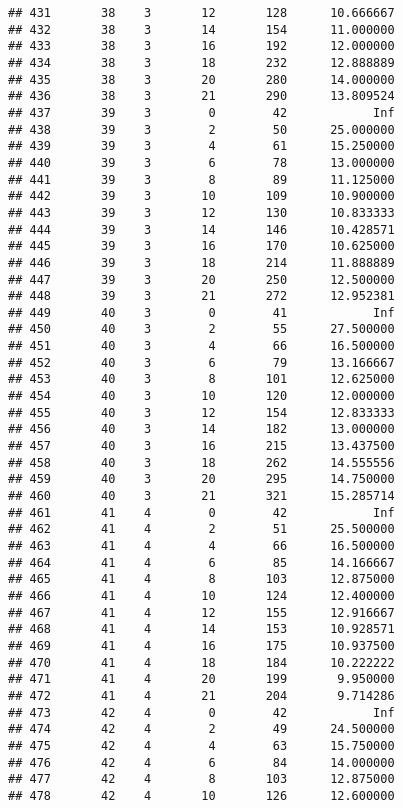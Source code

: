 \documentclass[
]{article}
\begin{document}
\begin{verbatim}
## 431       38    3       12       128      10.666667
## 432       38    3       14       154      11.000000
## 433       38    3       16       192      12.000000
## 434       38    3       18       232      12.888889
## 435       38    3       20       280      14.000000
## 436       38    3       21       290      13.809524
## 437       39    3        0        42            Inf
## 438       39    3        2        50      25.000000
## 439       39    3        4        61      15.250000
## 440       39    3        6        78      13.000000
## 441       39    3        8        89      11.125000
## 442       39    3       10       109      10.900000
## 443       39    3       12       130      10.833333
## 444       39    3       14       146      10.428571
## 445       39    3       16       170      10.625000
## 446       39    3       18       214      11.888889
## 447       39    3       20       250      12.500000
## 448       39    3       21       272      12.952381
## 449       40    3        0        41            Inf
## 450       40    3        2        55      27.500000
## 451       40    3        4        66      16.500000
## 452       40    3        6        79      13.166667
## 453       40    3        8       101      12.625000
## 454       40    3       10       120      12.000000
## 455       40    3       12       154      12.833333
## 456       40    3       14       182      13.000000
## 457       40    3       16       215      13.437500
## 458       40    3       18       262      14.555556
## 459       40    3       20       295      14.750000
## 460       40    3       21       321      15.285714
## 461       41    4        0        42            Inf
## 462       41    4        2        51      25.500000
## 463       41    4        4        66      16.500000
## 464       41    4        6        85      14.166667
## 465       41    4        8       103      12.875000
## 466       41    4       10       124      12.400000
## 467       41    4       12       155      12.916667
## 468       41    4       14       153      10.928571
## 469       41    4       16       175      10.937500
## 470       41    4       18       184      10.222222
## 471       41    4       20       199       9.950000
## 472       41    4       21       204       9.714286
## 473       42    4        0        42            Inf
## 474       42    4        2        49      24.500000
## 475       42    4        4        63      15.750000
## 476       42    4        6        84      14.000000
## 477       42    4        8       103      12.875000
## 478       42    4       10       126      12.600000

\end{verbatim}
\end{document}
